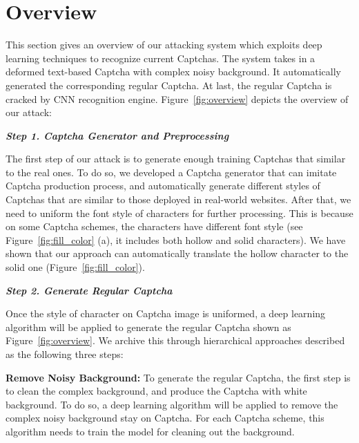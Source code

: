 \section{Overview}

This section gives an overview of our attacking system which exploits deep learning techniques to recognize current Captchas. The system takes in a deformed text-based Captcha with complex noisy background. It automatically generated the corresponding regular Captcha. At last, the regular Captcha is cracked by CNN recognition engine. Figure~\ref{fig:overview} depicts the overview of our attack:

\noindent \textbf{\emph{Step 1. Captcha Generator and Preprocessing}}

The first step of our attack is to generate enough training Captchas that similar to the real ones. To do so, we developed a Captcha generator that can imitate Captcha production process, and automatically generate different styles of Captchas that are similar to those deployed in real-world websites. After that, we need to uniform the font style of characters for further processing. This is because on some Captcha schemes, the characters have different font style (see Figure~\ref{fig:fill_color} (a), it includes both hollow and solid characters). We have shown that our approach can automatically translate the hollow character to the solid one (Figure~\ref{fig:fill_color}).


\noindent \textbf{\emph{Step 2. Generate Regular Captcha}}

Once the style of character on Captcha image is uniformed, a deep learning algorithm will be applied to generate the regular Captcha shown as Figure~\ref{fig:overview}. We archive this through hierarchical approaches described as the following three steps:

\noindent \circling{\textcolor{white}{1}} \textbf{Remove Noisy Background:}  To generate the regular Captcha, the first step is to clean the complex background, and produce the Captcha with white background.
To do so, a deep learning algorithm will be applied to remove the complex noisy background stay on Captcha.
For each Captcha scheme, this algorithm needs to train the model for cleaning out the background.

